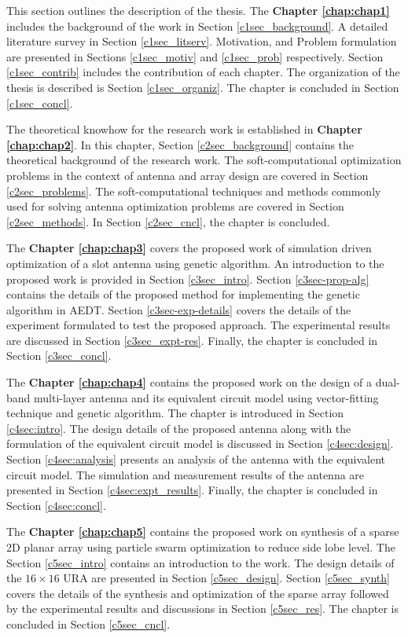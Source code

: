 This section outlines the description of the thesis. The \textbf{Chapter \ref{chap:chap1}} includes the background of the work in Section \ref{c1sec_background}. A detailed literature survey in Section \ref{c1sec_litserv}. Motivation, and Problem formulation are presented in Sections \ref{c1sec_motiv} and \ref{c1sec_prob} respectively. Section \ref{c1sec_contrib} includes the contribution of each chapter. The organization of the thesis is described is Section \ref{c1sec_organiz}. The chapter is concluded in Section \ref{c1sec_concl}.

The theoretical knowhow for the research work is established in \textbf{Chapter \ref{chap:chap2}}. In this chapter, Section \ref{c2sec_background} contains the theoretical background of the research work. The soft-computational optimization problems in the context of antenna and array design are covered in Section \ref{c2sec_problems}. The soft-computational techniques and methods commonly used for solving antenna optimization problems are covered in Section \ref{c2sec_methods}. In Section \ref{c2sec_cncl}, the chapter is concluded.

The \textbf{Chapter \ref{chap:chap3}} covers the proposed work of simulation driven optimization of a slot antenna using genetic algorithm. An introduction to the proposed work is provided in Section \ref{c3sec_intro}. Section \ref{c3sec-prop-alg} contains the details of the proposed method for implementing the genetic algorithm in AEDT. Section \ref{c3sec-exp-details} covers the details of the experiment formulated to test the proposed approach. The experimental results are discussed in Section \ref{c3sec_expt-res}. Finally, the chapter is concluded in Section \ref{c3sec_concl}.

The \textbf{Chapter \ref{chap:chap4}} contains the proposed work on the design of a dual-band multi-layer antenna and its equivalent circuit model using vector-fitting technique and genetic algorithm. The chapter is introduced in Section \ref{c4sec:intro}.  The design details of the proposed antenna along with the formulation of the equivalent circuit model is discussed in Section \ref{c4sec:design}. Section \ref{c4sec:analysis} presents an analysis of the antenna with the equivalent circuit model. The simulation and measurement results of the antenna are presented in Section \ref{c4sec:expt_results}. Finally, the chapter is concluded in Section \ref{c4sec:concl}.

The \textbf{Chapter \ref{chap:chap5}} contains the proposed work on synthesis of a sparse 2D planar array using particle swarm optimization to reduce side lobe level. The Section \ref{c5sec_intro} contains an introduction to the work. The design details of the $16\times16$ URA are presented in Section \ref{c5sec_design}. Section \ref{c5sec_synth} covers the details of the synthesis and optimization of the sparse array followed by the experimental results and discussions in Section \ref{c5sec_res}. The chapter is concluded in Section \ref{c5sec_cncl}.

